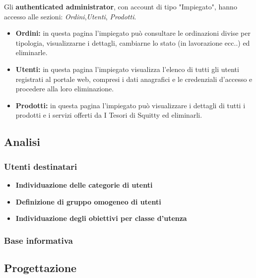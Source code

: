 Gli \textbf{authenticated administrator}, con account di tipo "Impiegato", hanno accesso alle sezioni: \textit{Ordini},\textit{Utenti}, \textit{Prodotti}.

\begin{itemize}
	\item \textbf{Ordini:} in questa pagina l'impiegato può consultare le ordinazioni divise per tipologia, visualizzarne i dettagli, cambiarne lo stato (in lavorazione ecc..) ed eliminarle.

	\item \textbf{Utenti:} in questa pagina l'impiegato visualizza l'elenco di tutti gli utenti registrati al portale web, compresi i dati anagrafici e le credenziali d'accesso e procedere alla loro eliminazione.

	\item \textbf{Prodotti:} in questa pagina l'impiegato può visualizzare i dettagli di tutti i prodotti e i servizi offerti da I Tesori di Squitty ed eliminarli.
\end{itemize}

\subsection{Analisi}

\subsubsection{Utenti destinatari}

\begin{itemize}
	\item \textbf{Individuazione delle categorie di utenti}

	\item \textbf{Definizione di gruppo omogeneo di utenti}

	\item \textbf{Individuazione degli obiettivi per classe d'utenza}
\end{itemize}


\subsubsection{Base informativa}

\subsection{Progettazione}

